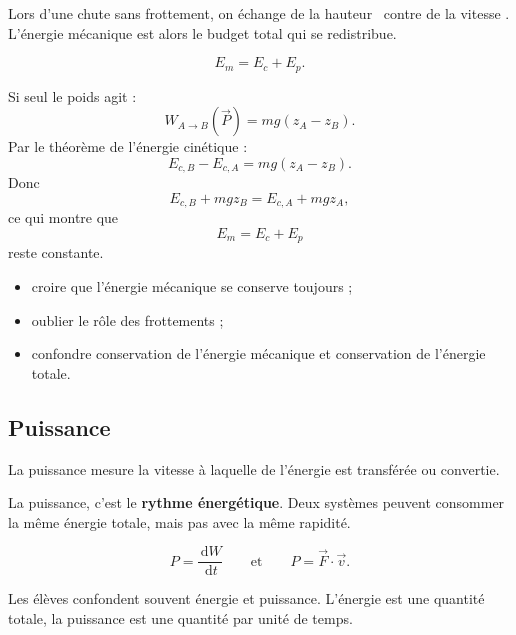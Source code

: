 \documentclass[11pt,a4paper]{article}
\newcommand{\dd}{\,\mathrm{d}}
\begin{document}
\begin{imagem}
Lors d'une chute sans frottement, on échange de la \og hauteur \fg\ contre de la \og vitesse \fg.
L'énergie mécanique est alors le budget total qui se redistribue.
\end{imagem}

\begin{bilan}
\[
E_m = E_c + E_p.
\]
\end{bilan}

\begin{demo}
Si seul le poids agit :
\[
W_{A\to B}(\vec P)=mg(z_A-z_B).
\]
Par le théorème de l'énergie cinétique :
\[
E_{c,B}-E_{c,A}=mg(z_A-z_B).
\]
Donc
\[
E_{c,B}+mgz_B=E_{c,A}+mgz_A,
\]
ce qui montre que
\[
E_m=E_c+E_p
\]
reste constante.
\end{demo}

\begin{erreurs}
\begin{itemize}
    \item croire que l'énergie mécanique se conserve toujours ;
    \item oublier le rôle des frottements ;
    \item confondre conservation de l'énergie mécanique et conservation de l'énergie totale.
\end{itemize}
\end{erreurs}

\subsection{Puissance}

\begin{sens}
La puissance mesure la vitesse à laquelle de l'énergie est transférée ou convertie.
\end{sens}

\begin{imagem}
La puissance, c'est le \textbf{rythme énergétique}.
Deux systèmes peuvent consommer la même énergie totale, mais pas avec la même rapidité.
\end{imagem}

\begin{bilan}
\[
P=\frac{\dd W}{\dd t}
\qquad \text{et} \qquad
P=\vec F\cdot \vec v.
\]
\end{bilan}

\begin{fausseintuition}
Les élèves confondent souvent énergie et puissance.
L'énergie est une quantité totale, la puissance est une quantité par unité de temps.
\end{fausseintuition}
\end{document}

